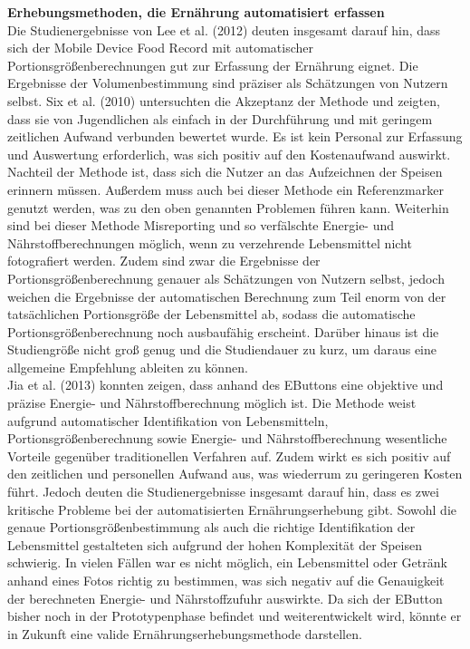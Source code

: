 \textbf{Erhebungsmethoden, die Ernährung automatisiert erfassen}\\
Die Studienergebnisse von Lee et al. (2012) deuten insgesamt darauf hin, dass sich der Mobile Device Food Record mit automatischer Portionsgrößenberechnungen gut zur Erfassung der Ernährung eignet. Die Ergebnisse der Volumenbestimmung sind präziser als Schätzungen von Nutzern selbst. Six et al. (2010) untersuchten die Akzeptanz der Methode und zeigten, dass sie von Jugendlichen als einfach in der Durchführung und mit geringem zeitlichen Aufwand verbunden bewertet wurde. Es ist kein Personal zur Erfassung und Auswertung erforderlich, was sich positiv auf den Kostenaufwand auswirkt. 
Nachteil der Methode ist, dass sich die Nutzer an das Aufzeichnen der Speisen erinnern müssen. Außerdem muss auch bei dieser Methode ein Referenzmarker genutzt werden, was zu den oben genannten Problemen führen kann. Weiterhin sind bei dieser Methode Misreporting und so verfälschte Energie- und Nährstoffberechnungen möglich, wenn zu verzehrende Lebensmittel nicht fotografiert werden. Zudem sind zwar die Ergebnisse der Portionsgrößenberechnung genauer als Schätzungen von Nutzern selbst, jedoch weichen die Ergebnisse der automatischen Berechnung zum Teil enorm von der tatsächlichen Portionsgröße der Lebensmittel ab, sodass die automatische Portionsgrößenberechnung noch ausbaufähig erscheint. Darüber hinaus ist die Studiengröße nicht groß genug und die Studiendauer zu kurz, um daraus eine allgemeine Empfehlung ableiten zu können. \\
Jia et al. (2013) konnten zeigen, dass anhand des EButtons eine objektive und präzise Energie- und Nährstoffberechnung möglich ist. Die Methode weist aufgrund automatischer Identifikation von Lebensmitteln, Portionsgrößenberechnung sowie Energie- und Nährstoffberechnung wesentliche Vorteile gegenüber traditionellen Verfahren auf. Zudem wirkt es sich positiv auf den zeitlichen und personellen Aufwand aus, was wiederrum zu geringeren Kosten führt. 
Jedoch deuten die Studienergebnisse insgesamt darauf hin, dass es zwei kritische Probleme bei der automatisierten Ernährungserhebung gibt. Sowohl die genaue Portionsgrößenbestimmung als auch die richtige Identifikation der Lebensmittel gestalteten sich aufgrund der hohen Komplexität der Speisen schwierig. In vielen Fällen war es nicht möglich, ein Lebensmittel oder Getränk anhand eines Fotos richtig zu bestimmen, was sich negativ auf die Genauigkeit der berechneten Energie- und Nährstoffzufuhr auswirkte. Da sich der EButton bisher noch in der Prototypenphase befindet und weiterentwickelt wird, könnte er in Zukunft eine valide Ernährungserhebungsmethode darstellen.


